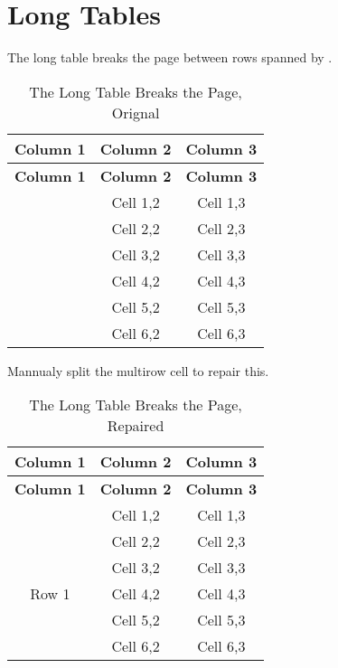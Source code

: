 \documentclass{article}
\newcommand{\incode}[1]{%
  	\begingroup
    	\setlength{\fboxsep}{1pt}%
    	\colorbox{inlinecodebg}{\ttfamily\detokenize{#1}}%
  	\endgroup
}
\begin{document}
\newpage
\section{Long Tables}
The long table breaks the page between rows spanned by \incode{\multirow}.
\vspace{38\baselineskip}

\begin{longtable}{|c|c|c|}
	\caption{The Long Table Breaks the Page, Orignal} \\
    \hline
    \textbf{Column 1} & \textbf{Column 2} & \textbf{Column 3} \\ \hline
    \endfirsthead
    \hline
    \textbf{Column 1} & \textbf{Column 2} & \textbf{Column 3} \\ \hline
    \endhead
    \hline
    \endfoot
    \hline
    \endlastfoot

    \multirow{6}{*}{Row 1} & Cell 1,2 & Cell 1,3 \\ \cline{2-3}
                        & Cell 2,2 & Cell 2,3 \\ \cline{2-3}
                        & Cell 3,2 & Cell 3,3 \\ \cline{2-3}
                        & Cell 4,2 & Cell 4,3 \\ \cline{2-3}
                        & Cell 5,2 & Cell 5,3 \\ \cline{2-3}
                        & Cell 6,2 & Cell 6,3 \\ \cline{2-3}
\end{longtable}

Mannualy split the multirow cell to repair this.
\vspace{32\baselineskip}

\begin{longtable}{|c|c|c|}
	\caption{The Long Table Breaks the Page, Repaired} \\
    \hline
    \textbf{Column 1} & \textbf{Column 2} & \textbf{Column 3} \\ \hline
    \endfirsthead
    \hline
    \textbf{Column 1} & \textbf{Column 2} & \textbf{Column 3} \\ \hline
    \endhead
    \hline
    \endfoot
    \hline
    \endlastfoot

    \multirow{1}{*}{Row 1} & Cell 1,2 & Cell 1,3 \\ \hline
    \multirow{5}{*}{Row 1} & Cell 2,2 & Cell 2,3 \\ \cline{2-3}
    & Cell 3,2 & Cell 3,3 \\ \cline{2-3}
    & Cell 4,2 & Cell 4,3 \\ \cline{2-3}
    & Cell 5,2 & Cell 5,3 \\ \cline{2-3}
    & Cell 6,2 & Cell 6,3 \\ \cline{2-3}
\end{longtable}
\end{document}
